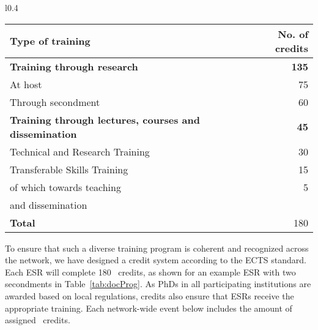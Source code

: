 \begin{wraptable}{l}{0.4\textwidth}
    \vspace{-2mm}
	\caption{Example \acronym\ doctoral program\label{tab:docProg}
	}\vspace{4mm}
	\footnotesize
	\begin{tabular}{p{45mm}r}
		\midrule
		Type of training & No. of credits \tabularnewline\midrule
		\textbf{Training through research}  & \textbf{135} \tabularnewline
		\hspace{5mm}At host & 75 \tabularnewline
		\hspace{5mm}Through secondment  & 60 \tabularnewline\midrule
		\textbf{Training through lectures, courses and dissemination} &  \textbf{45} \tabularnewline
		\hspace{5mm}Technical and Research Training & 30 \tabularnewline
		\hspace{5mm}Transferable Skills Training & 15 \tabularnewline
		\hspace{10mm}of which towards teaching & 5\tabularnewline
        \hspace{10mm}and dissemination & \tabularnewline
		\textbf{Total} &  180 \tabularnewline
		\bottomrule
	\end{tabular}
    \vspace{-2mm}
\end{wraptable}

To ensure that such a diverse training program is coherent and recognized across the network, we have designed  a \acronym credit system according to the ECTS standard. 
Each ESR will complete 180 \acronym\ credits, as shown for an example ESR with two secondments in Table~\ref{tab:docProg}.
As PhDs in all participating institutions are awarded based on local regulations, \acronym credits also ensure that ESRs receive the appropriate training. 
Each network-wide event below includes the amount of assigned \acronym\ credits.

